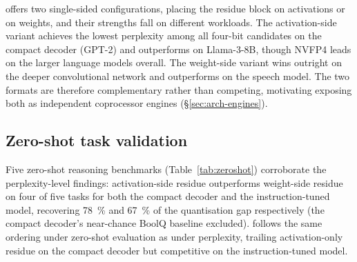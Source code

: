 \fpfourres{} offers two single-sided configurations, placing the residue block on activations or on weights, and their strengths fall on different workloads. The activation-side variant achieves the lowest perplexity among all four-bit candidates on the compact decoder (GPT-2) and outperforms \mtwo{} on Llama-3-8B, though NVFP4 leads on the larger language models overall. The weight-side variant wins outright on the deeper convolutional network and outperforms \mtwo{} on the speech model. The two formats are therefore complementary rather than competing, motivating exposing both as independent coprocessor engines (\S\ref{sec:arch-engines}).

\subsection{Zero-shot task validation}
\label{sec:analysis-zeroshot}



Five zero-shot reasoning benchmarks (Table~\ref{tab:zeroshot}) corroborate the perplexity-level findings: activation-side residue outperforms weight-side residue on four of five tasks for both the compact decoder and the instruction-tuned model, recovering \SI{78}{\percent} and \SI{67}{\percent} of the quantisation gap respectively (the compact decoder's near-chance BoolQ baseline excluded). \mtwo{} follows the same ordering under zero-shot evaluation as under perplexity, trailing activation-only residue on the compact decoder but competitive on the instruction-tuned model.